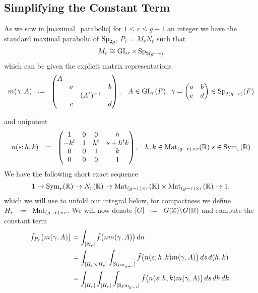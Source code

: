 \subsection{Simplifying the Constant Term}
As we saw in \ref{maximal_parabolic} for \(1\leq r\leq g-1\) an integer we have the standard maximal parabolic of \(\operatorname{Sp}_{2g}\), \(P_r = M_rN_r\) such that 
\[M_r \cong \operatorname{GL}_r\times \operatorname{Sp}_{2(g-r)}\]
which can be given the explicit matrix representations 
    \[m(\gamma, A) \defeq \begin{pmatrix}
        A &&& \\
         &a&&b \\
         &&(A^t)\inv& \\
         &c&&d \\
    \end{pmatrix}, \;\;\; A\in \GL_r(F), \; \gamma = \begin{pmatrix}
        a & b\\
        c & d \\
    \end{pmatrix} \in \Sp_{2(g-r)}(F) \]

    and unipotent 
    \[ n(s;h,k) \defeq \begin{pmatrix} 1 & 0 & 0 & h\\ -k^t & 1 & h^t & s+h^t k\\ 0 & 0 & 1 & k\\ 0 & 0 & 0 & 1 \end{pmatrix}, \;\;\; h, k\in\mathrm{Mat}_{(g-r)\times r}(\R)\; s\in\mathrm{Sym}_{r}(\R)\]
We have the following short exact sequence 
\[ 1\to \mathrm{Sym}_{r}(\R)\to N_r(\R)\to \mathrm{Mat}_{(g-r)\times r}(\R)\times\mathrm{Mat}_{(g-r)\times r}(\R) \to 1. \]
which we will use to unfold our integral below, for compactness we define \(H_r \defeq \mathrm{Mat}_{(g-r)\times r}\). We will now denote \([G] \defeq G(\Z)\backslash G(\R)\) and compute the constant term
\begin{align}
		\tilde f_{P_r}\bigl(m(\gamma, A)\bigr)
		& = \int^{}_{[N_r]}\tilde f\bigl(n m(\gamma, A)\bigr)\,dn \notag\\
		& = \int^{}_{[H_r\times H_r]}\int^{}_{[\mathrm{Sym}_{g-r}]}\tilde f\bigl(n(s; h, k) m(\gamma, A)\bigr)\,ds\,d(h,k) \notag\\
		& = \int^{}_{[H_r]}\int^{}_{[H_r]}\int^{}_{[\mathrm{Sym}_{g-r}]}\tilde f\bigl(n(s; h, k) m(\gamma, A)\bigr)\,ds\,dh\,dk.
\end{align} 

